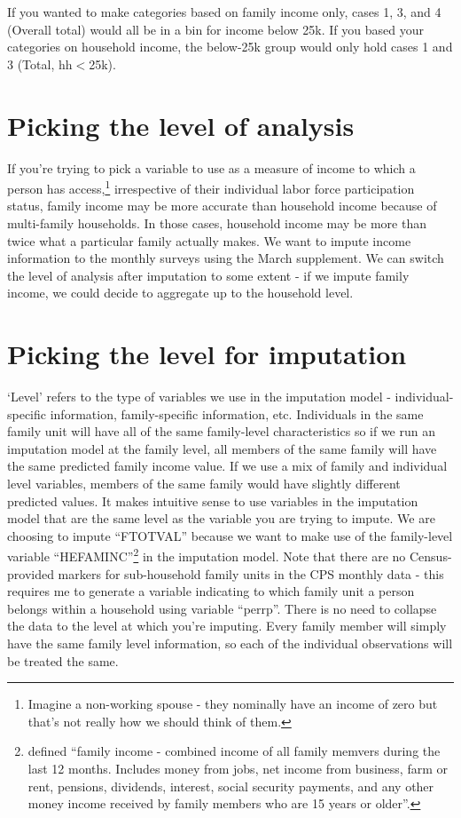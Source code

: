\documentclass{article}
\begin{document}
		If you wanted to make categories based on family income only, cases 1, 3, and 4 (Overall total) would all be in a bin for income below 25k. If you based your categories on household income, the below-25k group would only hold cases 1 and 3 (Total, hh$<$25k). 
		
		\section{Picking the level of analysis}
		 If you're trying to pick a variable to use as a measure of income to which a person has access,\footnote{Imagine a non-working spouse - they nominally have an income of zero but that's not really how we should think of them.} irrespective of their individual labor force participation status, family income may be more accurate than household income because of multi-family households. In those cases, household income may be more than twice what a particular family actually makes. We want to impute income information to the monthly surveys using the March supplement. We can switch the level of analysis after imputation to some extent - if we impute family income, we could decide to aggregate up to the household level. 
		
		\section{Picking the level for imputation}
		`Level' refers to the type of variables we use in the imputation model - individual-specific information, family-specific information, etc. Individuals in the same family unit will have all of the same family-level characteristics so if we run an imputation model at the family level, all members of the same family will have the same predicted family income value. If we use a mix of family and individual level variables, members of the same family would have slightly different predicted values. It makes intuitive sense to use variables in the imputation model that are the same level as the variable you are trying to impute. We are choosing to impute ``FTOTVAL'' because we want to make use of the family-level variable ``HEFAMINC''\footnote{defined ``family income - combined income of all family memvers during the last 12 months. Includes money from jobs, net income from business, farm or rent, pensions, dividends, interest, social security payments, and any other money income received by family members who are 15 years or older''.} in the imputation model. Note that there are no Census-provided markers for sub-household family units in the CPS monthly data - this requires me to generate a variable indicating to which family unit a person belongs within a household using variable ``perrp''.
		There is no need to collapse the data to the level at which you're imputing. Every family member will simply have the same family level information, so each of the individual observations will be treated the same. 
		
\end{document}

